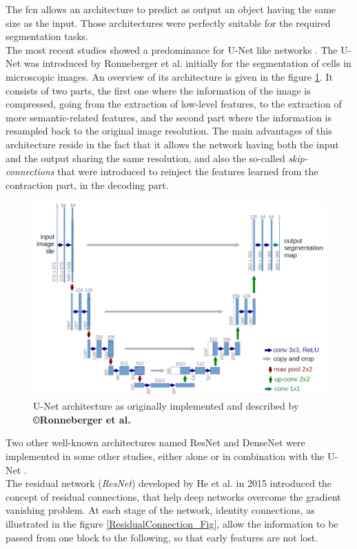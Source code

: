 The \ac{fcn} allows an architecture to predict as output an object having the
same size as the input. Those architectures were perfectly suitable for
the required segmentation tasks.\\
The most recent studies showed a predominance for U-Net like networks \cite{Vorontsov2018, Yuan2017}. The U-Net was
introduced by Ronneberger et al. \cite{Ronneberger2015} initially for the segmentation of cells
in microscopic images. An overview of its architecture is given in the
figure \ref{U_Net_Figure}. It consists of two parts, the first one where the
information of the image is compressed, going from the extraction of
low-level features, to the extraction of more semantic-related features,
and the second part where the information is resampled back to the
original image resolution. The main advantages of this architecture
reside in the fact that it allows the network having both the input and
the output sharing the same resolution, and also the so-called
\emph{skip-connections} that were introduced to reinject the features
learned from the contraction part, in the decoding part.

\begin{figure}[th!]
	\centering
	\includegraphics[width=0.7\linewidth]{images/u-net-architecture}
	\caption{U-Net architecture as originally implemented and described by \textbf{©Ronneberger et al.\cite{Ronneberger2015}}}
	\label{U_Net_Figure}
\end{figure}

Two other well-known architectures named ResNet and DenseNet were
implemented in some other studies, either alone or in combination with
the U-Net \cite{Han2017, Chlebus2018, Bi2017, Kaluva2018, Li2018}.\\
The residual network (\emph{ResNet}) developed by He et al. \cite{He2015} in
2015 introduced the concept of residual connections, that help deep
networks overcome the gradient vanishing problem. At each stage of the
network, identity connections, as illustrated in the figure \ref{ResidualConnection_Fig}, allow the
information to be passed from one block to the following, so that early
features are not lost.

